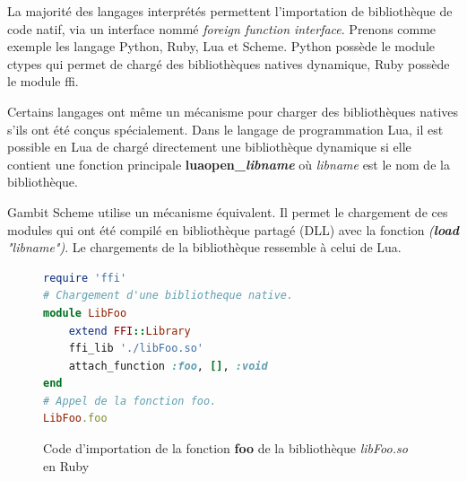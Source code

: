 \documentclass[12pt,initial,twoside,maitrise]{dms}
\numberwithin{equation}{section}
\numberwithin{table}{chapter}
\numberwithin{figure}{chapter}
\begin{document}
La majorité des langages interprétés permettent l'importation de bibliothèque de code natif, via un interface
nommé \textit{foreign function interface}.
Prenons comme exemple les langage Python, Ruby, Lua et Scheme. Python possède le module ctypes
qui permet de chargé des bibliothèques natives dynamique, Ruby possède le module ffi.


Certains langages ont même un mécanisme pour charger des bibliothèques natives s'ils ont été conçus spécialement.
Dans le langage de programmation Lua, il est possible en Lua de chargé directement
une bibliothèque dynamique si elle contient une fonction principale \textbf{luaopen\_\textit{libname}}
où \textit{libname} est le nom de la bibliothèque.

Gambit Scheme utilise un mécanisme équivalent. Il permet le chargement de ces modules qui ont été compilé
en bibliothèque partagé (DLL) avec la fonction \textit{(\textbf{load} "libname")}. Le chargements de la
bibliothèque ressemble à celui de Lua.


\begin{center}
\begin{figure}[ht]
\begin{lstlisting}[language=ruby,frame=single]
require 'ffi'
# Chargement d'une bibliotheque native.
module LibFoo
    extend FFI::Library
    ffi_lib './libFoo.so'
    attach_function :foo, [], :void
end
# Appel de la fonction foo.
LibFoo.foo
\end{lstlisting}
\caption{Code d'importation de la fonction \textbf{foo} de la bibliothèque \textit{libFoo.so} en Ruby}
\end{figure}
\end{center}
\end{document}
